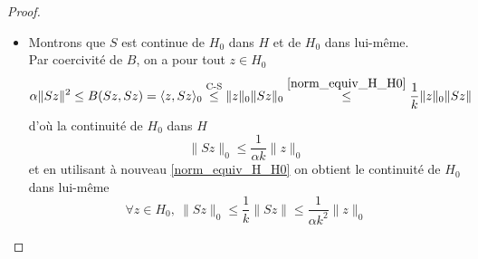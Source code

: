 \begin{appendices}
\begin{proof}
\begin{itemize}
        \begin{eqnarray*}
            \forall x \in H, \ B(Sv, x) = \langle v,x \rangle_0 \ \ \ &\text{ et }& \ \ \ B(Sw,x)=\langle w,x\rangle_0
        \end{eqnarray*}
        en utilisant l'hypothèse, on obtient 
        \begin{eqnarray*}
            \forall x \in H, \ \langle v,x \rangle_0 = \langle w, x \rangle_0 &\Longrightarrow& \langle v-w, x \rangle_0=0
        \end{eqnarray*}
        donc $v-w \in H^\perp = \overline{H}^\perp = H_0^\perp=\{0\}$ donc $v=w$. Ainsi, $S$ admet un inverse que l'on note $E$ et on a bien 
        \begin{equation*}
            \forall x \in D, \ \forall y \in H, B(x,y) = \langle S^{-1}x,y\rangle_0 = \langle Ex, y \rangle_0
        \end{equation*}
        \item Montrons que $S$ est continue de $H_0$ dans $H$ et de $H_0$ dans lui-même.
        \\
        Par coercivité de $B$, on a pour tout $z \in H_0$
        \begin{equation*}
            \alpha \|Sz\|^2 \leq B(Sz,Sz) = \langle z, Sz \rangle_0 \overset{\text{C-S}}{\leq} \|z\|_0\|Sz\|_0 \overset{\eqref{norm_equiv_H_H0}}{\leq} \frac{1}{k}\|z\|_0\|Sz\|
        \end{equation*}
        d'où la continuité de $H_0$ dans $H$
        \begin{equation*}
            \|Sz\|_0 \leq \frac{1}{\alpha k} \|z\|_0
        \end{equation*}
        et en utilisant à nouveau \eqref{norm_equiv_H_H0} on obtient le continuité de $H_0$ dans lui-même
        \begin{equation*}
            \forall z \in H_0, \ \|Sz\|_0 \leq \frac{1}{k}\|Sz\| \leq \frac{1}{\alpha k^2}\|z\|_0
        \end{equation*}
    \end{itemize}
\end{proof}

\newpage


\end{appendices}
